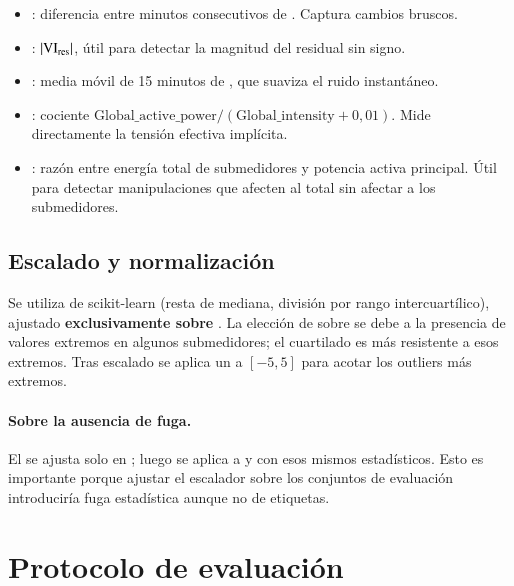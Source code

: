 \begin{itemize}[leftmargin=*,topsep=0pt]
  \item {}: diferencia entre minutos consecutivos de . Captura cambios bruscos.
  \item {}: $|\mathrm{VI}_{\text{res}}|$, útil para detectar la magnitud del residual sin signo.
  \item {}: media móvil de 15 minutos de , que suaviza el ruido instantáneo.
  \item {}: cociente $\mathrm{Global\_active\_power} / (\mathrm{Global\_intensity} + 0{,}01)$. Mide directamente la tensión efectiva implícita.
  \item {}: razón entre energía total de submedidores y potencia activa principal. Útil para detectar manipulaciones que afecten al total sin afectar a los submedidores.
\end{itemize}

\subsection{Escalado y normalización}

Se utiliza  de scikit-learn (resta de mediana, división por rango intercuartílico), ajustado \textbf{exclusivamente sobre }. La elección de  sobre  se debe a la presencia de valores extremos en algunos submedidores; el cuartilado es más resistente a esos extremos. Tras escalado se aplica un  a $[-5, 5]$ para acotar los outliers más extremos.

\paragraph{Sobre la ausencia de fuga.} El  se ajusta solo en ; luego se aplica a  y  con esos mismos estadísticos. Esto es importante porque ajustar el escalador sobre los conjuntos de evaluación introduciría fuga estadística aunque no de etiquetas.

\section{Protocolo de evaluación}
\label{sec:protocolo}

